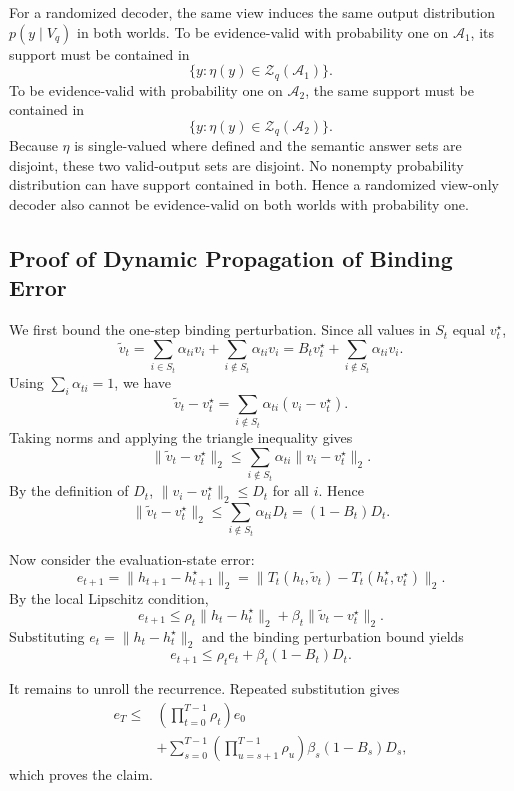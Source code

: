 For a randomized decoder, the same view induces the same output distribution $p(y\mid V_q)$ in both worlds.
To be evidence-valid with probability one on $\mathcal A_1$, its support must be contained in
\[
\{y:\eta(y)\in\mathcal Z_q(\mathcal A_1)\}.
\]
To be evidence-valid with probability one on $\mathcal A_2$, the same support must be contained in
\[
\{y:\eta(y)\in\mathcal Z_q(\mathcal A_2)\}.
\]
Because $\eta$ is single-valued where defined and the semantic answer sets are disjoint, these two valid-output sets are disjoint.
No nonempty probability distribution can have support contained in both.
Hence a randomized view-only decoder also cannot be evidence-valid on both worlds with probability one.

\subsection{Proof of Dynamic Propagation of Binding Error}
\label{app:proof-dynamic-binding}

We first bound the one-step binding perturbation.
Since all values in $S_t$ equal $v_t^\star$,
\[
\tilde v_t
=
\sum_{i\in S_t}\alpha_{ti}v_i
+
\sum_{i\notin S_t}\alpha_{ti}v_i
=
B_t v_t^\star
+
\sum_{i\notin S_t}\alpha_{ti}v_i .
\]
Using $\sum_i\alpha_{ti}=1$, we have
\[
\tilde v_t-v_t^\star
=
\sum_{i\notin S_t}\alpha_{ti}(v_i-v_t^\star).
\]
Taking norms and applying the triangle inequality gives
\[
\lVert\tilde v_t-v_t^\star\rVert_2
\le
\sum_{i\notin S_t}\alpha_{ti}\lVert v_i-v_t^\star\rVert_2 .
\]
By the definition of $D_t$, $\lVert v_i-v_t^\star\rVert_2\le D_t$ for all $i$.
Hence
\[
\lVert\tilde v_t-v_t^\star\rVert_2
\le
\sum_{i\notin S_t}\alpha_{ti}D_t
=
(1-B_t)D_t .
\]

Now consider the evaluation-state error:
\[
e_{t+1}
=
\lVert h_{t+1}-h_{t+1}^\star\rVert_2
=
\lVert T_t(h_t,\tilde v_t)-T_t(h_t^\star,v_t^\star)\rVert_2 .
\]
By the local Lipschitz condition,
\[
e_{t+1}
\le
\rho_t\lVert h_t-h_t^\star\rVert_2
+
\beta_t\lVert\tilde v_t-v_t^\star\rVert_2 .
\]
Substituting $e_t=\lVert h_t-h_t^\star\rVert_2$ and the binding perturbation bound yields
\[
e_{t+1}
\le
\rho_t e_t+\beta_t(1-B_t)D_t .
\]

It remains to unroll the recurrence.
Repeated substitution gives
\[
\begin{aligned}
e_T
\le&
\left(\prod_{t=0}^{T-1}\rho_t\right)e_0\\
&+
\sum_{s=0}^{T-1}
\left(\prod_{u=s+1}^{T-1}\rho_u\right)
\beta_s(1-B_s)D_s ,
\end{aligned}
\]
which proves the claim.

